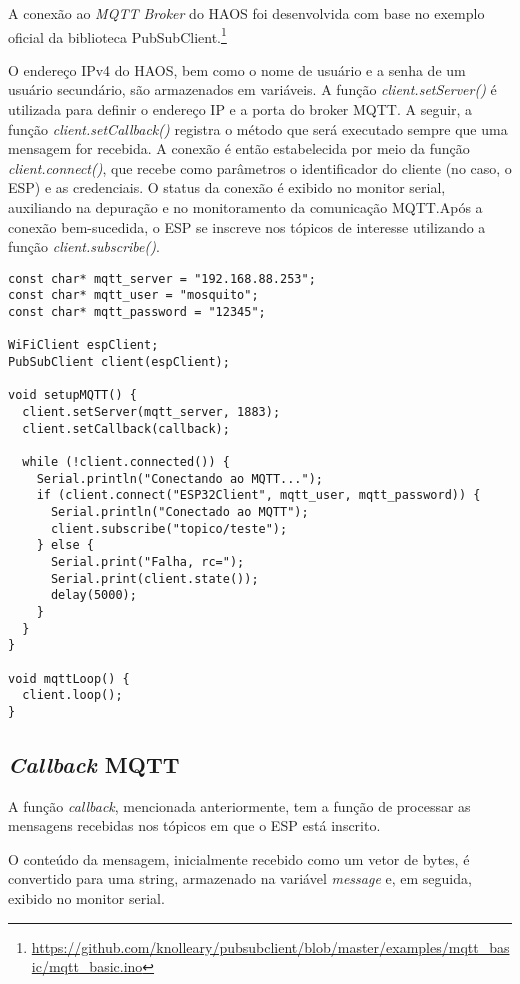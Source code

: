 \documentclass[]{abntex2}
\begin{document}
A conexão ao \textit{MQTT Broker} do HAOS foi desenvolvida com base no exemplo
oficial da biblioteca
PubSubClient.\footnote{\url{https://github.com/knolleary/pubsubclient/blob/master/examples/mqtt_basic/mqtt_basic.ino}}

O endereço IPv4 do HAOS, bem como o nome de usuário e a senha de um usuário
secundário, são armazenados em variáveis. A função \textit{client.setServer()}
é utilizada para definir o endereço IP e a porta do broker MQTT. A seguir, a
função \textit{client.setCallback()} registra o método que será executado
sempre que uma mensagem for recebida. A conexão é então estabelecida por meio
da função \textit{client.connect()}, que recebe como parâmetros o identificador
do cliente (no caso, o ESP) e as credenciais. O status da conexão é exibido no
monitor serial, auxiliando na depuração e no monitoramento da comunicação
MQTT.Após a conexão bem-sucedida, o ESP se inscreve nos tópicos de interesse
utilizando a função \textit{client.subscribe()}.

\begin{verbatim}
const char* mqtt_server = "192.168.88.253";
const char* mqtt_user = "mosquito";
const char* mqtt_password = "12345";

WiFiClient espClient;
PubSubClient client(espClient);

void setupMQTT() {
  client.setServer(mqtt_server, 1883);
  client.setCallback(callback);

  while (!client.connected()) {
    Serial.println("Conectando ao MQTT...");
    if (client.connect("ESP32Client", mqtt_user, mqtt_password)) {
      Serial.println("Conectado ao MQTT");
      client.subscribe("topico/teste");
    } else {
      Serial.print("Falha, rc=");
      Serial.print(client.state());
      delay(5000);
    }
  }
}

void mqttLoop() {
  client.loop();
}
\end{verbatim}
\clearpage
\subsection{\textit{Callback} MQTT}

A função \textit{callback}, mencionada anteriormente, tem a função de processar
as mensagens recebidas nos tópicos em que o ESP está inscrito.

O conteúdo da mensagem, inicialmente recebido como um vetor de bytes, é
convertido para uma string, armazenado na variável \textit{message} e, em
seguida, exibido no monitor serial.
\end{document}
